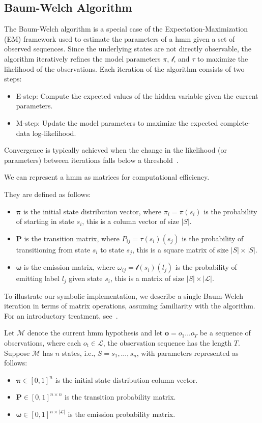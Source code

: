 \subsection{Baum-Welch Algorithm}\label{subsec:baum-welch}
The Baum-Welch algorithm is a special case of the Expectation-Maximization (EM) framework used to estimate the parameters of a \gls{hmm} given a set of observed sequences.
Since the underlying states are not directly observable, the algorithm iteratively refines the model parameters $\pi$, $\mathscr{l}$, and $\tau$ to maximize the likelihood of the observations.
Each iteration of the algorithm consists of two steps:
\begin{itemize}
    \item E-step: Compute the expected values of the hidden variable given the current parameters.
    \item M-step: Update the model parameters to maximize the expected complete-data log-likelihood.
\end{itemize}

Convergence is typically achieved when the change in the likelihood (or parameters) between iterations falls below a threshold~\cite{Rabiner89}.

We can represent a \gls{hmm} as matrices for computational efficiency.

They are defined as follows:
\begin{itemize}
    \item $\pmb{\pi}$ is the initial state distribution vector, where $\pi_i = \pi(s_i)$ is the probability of starting in state $s_i$, this is a column vector of size $|S|$.
    \item $\pmb{P}$ is the transition matrix, where $P_{ij} = \tau(s_i)(s_j)$ is the probability of transitioning from state $s_i$ to state $s_j$, this is a square matrix of size $|S| \times |S|$.
    \item $\pmb{\omega}$ is the emission matrix, where $\omega_{ij} = \mathscr{l}(s_i)(l_j)$ is the probability of emitting label $l_j$ given state $s_i$, this is a matrix of size $|S| \times |\mathcal{L}|$.
\end{itemize}

To illustrate our symbolic implementation, we describe a single Baum-Welch iteration in terms of matrix operations, assuming familiarity with the algorithm. For an introductory treatment, see~\cite{Baum70,reynouard2024learning}.

Let $\mathcal{M}$ denote the current \gls{hmm} hypothesis and let $\mathbf{o} = o_1 \dots o_T$ be a sequence of observations, where each $o_t \in \mathcal{L}$, the observation sequence has the length $T$. Suppose $\mathcal{M}$ has $n$ states, i.e., $S = {s_1, \dots, s_n}$, with parameters represented as follows:
\begin{itemize}
    \item $\pmb{\pi} \in [0,1]^{n}$ is the initial state distribution column vector.
    \item $\pmb{P} \in [0,1]^{n \times n}$ is the transition probability matrix.
    \item $\pmb{\omega} \in [0,1]^{n \times |\mathcal{L}|}$ is the emission probability matrix.
\end{itemize}

